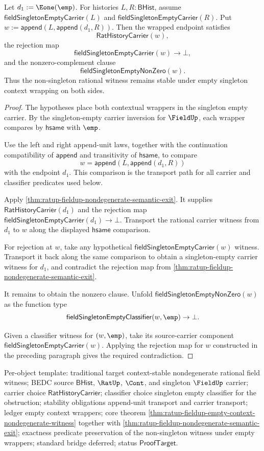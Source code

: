 \begin{theorem}
\label{thm:ratup-fieldup-empty-context-nondegenerate-witness}
Let $d_1:=\Eone(\emp)$. For histories $L,R:\mathsf{BHist}$, assume
$\mathsf{fieldSingletonEmptyCarrier}(L)$ and
$\mathsf{fieldSingletonEmptyCarrier}(R)$. Put
$w:=\mathsf{append}(L,\mathsf{append}(d_1,R))$. Then the wrapped endpoint
satisfies
$$
\mathsf{RatHistoryCarrier}(w),
$$
the rejection map
$$
\mathsf{fieldSingletonEmptyCarrier}(w)\to\bot,
$$
and the nonzero-complement clause
$$
\mathsf{fieldSingletonEmptyNonZero}(w).
$$
Thus the non-singleton rational witness remains stable under empty singleton
context wrapping on both sides.
\end{theorem}
\begin{proof}
The hypotheses place both contextual wrappers in the singleton empty carrier.
By the singleton-empty carrier inversion for $\FieldUp$, each wrapper compares
by $\mathsf{hsame}$ with $\emp$.

Use the left and right append-unit laws, together with the continuation
compatibility of $\mathsf{append}$ and transitivity of $\mathsf{hsame}$, to
compare
$$
w=\mathsf{append}(L,\mathsf{append}(d_1,R))
$$
with the endpoint $d_1$. This comparison is the transport path for all carrier
and classifier predicates used below.

Apply \autoref{thm:ratup-fieldup-nondegenerate-semantic-exit}. It supplies
$\mathsf{RatHistoryCarrier}(d_1)$ and the rejection map
$\mathsf{fieldSingletonEmptyCarrier}(d_1)\to\bot$. Transport the rational
carrier witness from $d_1$ to $w$ along the displayed $\mathsf{hsame}$
comparison.

For rejection at $w$, take any hypothetical
$\mathsf{fieldSingletonEmptyCarrier}(w)$ witness. Transport it back along the
same comparison to obtain a singleton-empty carrier witness for $d_1$, and
contradict the rejection map from
\autoref{thm:ratup-fieldup-nondegenerate-semantic-exit}.

It remains to obtain the nonzero clause. Unfold
$\mathsf{fieldSingletonEmptyNonZero}(w)$ as the function type
$$
\mathsf{fieldSingletonEmptyClassifier}(w,\emp)\to\bot.
$$

Given a classifier witness for $(w,\emp)$, take its source-carrier component
$\mathsf{fieldSingletonEmptyCarrier}(w)$. Applying the rejection map for $w$
constructed in the preceding paragraph gives the required contradiction.
\end{proof}

Per-object template: traditional target context-stable nondegenerate rational
field witness; BEDC source $\mathsf{BHist}$, $\RatUp$, $\Cont$, and singleton
$\FieldUp$ carrier; carrier choice $\mathsf{RatHistoryCarrier}$; classifier
choice singleton empty classifier for the obstruction; stability obligations
append-unit transport and carrier transport; ledger empty context wrappers; core
theorem \autoref{thm:ratup-fieldup-empty-context-nondegenerate-witness} together
with \autoref{thm:ratup-fieldup-nondegenerate-semantic-exit}; exactness
predicate preservation of the non-singleton witness under empty wrappers;
standard bridge deferred; status $\mathsf{ProofTarget}$.
